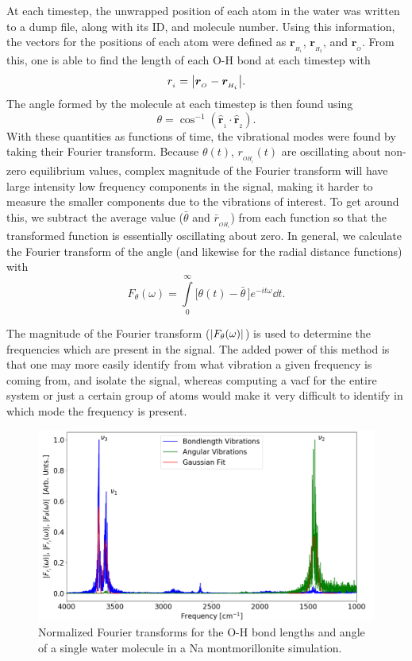 		At each timestep, the unwrapped position of each atom in the water was written to a dump file, along with its ID, and molecule number. Using this information, the vectors for the positions of each atom were defined as $\bm{r}_{_{H_1}}$, $\bm{r}_{_{H_2}}$, and $\bm{r}_{_O}$. From this, one is able to find the length of each O-H bond at each timestep with
		\begin{equation}
			r_{_{i}} = \abs{ \bm{r}_{_O} - \bm{r}_{_{H_i}} }.
		\end{equation}
		The angle formed by the molecule at each timestep is then found using
		\begin{equation}
			\theta = \cos^{-1}( \bm{\hat{r}}_{_{1}}\cdot\bm{\hat{r}}_{_{2}} ).
		\end{equation}
		With these quantities as functions of time, the vibrational modes were found by taking their Fourier transform. Because $\theta(t)$, $r_{_{OH_i}}(t)$ are oscillating about non-zero equilibrium values, complex magnitude of the Fourier transform will have large intensity low frequency components in the signal, making  it harder to measure the smaller components due to the vibrations of interest. To get around this, we subtract the average value ($\bar{\theta}$ and $\bar{r}_{_{OH_i}}$) from each function so that the transformed function is essentially oscillating about zero. In general, we calculate the Fourier transform of the angle (and likewise for the radial distance functions) with
		\begin{equation}
			F_\theta (\omega) = \int\limits_{0}^\infty \big[\theta(t) - \bar{\theta}\,\big]e^{-it\omega} \dd t.
		\end{equation}
		
		The magnitude of the Fourier transform ($\abs{F_\theta(\omega)}$) is used to determine the frequencies which are present in the signal. The added power of this method is that one may more easily identify from what vibration a given frequency is coming from, and isolate the signal, whereas computing a vacf for the entire system or just a certain group of atoms would make it very difficult to identify in which mode the frequency is present.
		
		\begin{figure}
			\includegraphics[scale=0.5]{images/Vibration_Modes.png}
			\caption{Normalized Fourier transforms for the O-H bond lengths and angle of a single water molecule in a Na montmorillonite simulation.}
			\label{fig:vib_modes}
		\end{figure}
		
